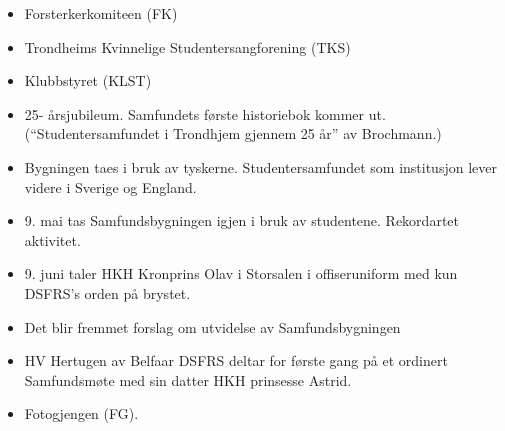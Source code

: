 
\begin{itemize}
  \item Forsterkerkomiteen (FK)
  \item Trondheims Kvinnelige Studentersangforening (TKS)
\end{itemize}


\begin{itemize}
  \item Klubbstyret (KLST)
\end{itemize}


\begin{itemize}
  \item 25- årsjubileum. Samfundets første historiebok kommer ut. (``Studentersamfundet i Trondhjem gjennem 25 år'' av
Brochmann.)
\end{itemize}


\begin{itemize}
  \item Bygningen taes i bruk av tyskerne. Studentersamfundet som institusjon lever videre i Sverige og England.
\end{itemize}


\begin{itemize}
  \item 9. mai tas Samfundsbygningen igjen i bruk av studentene. Rekordartet aktivitet.
  \item 9. juni taler HKH Kronprins Olav i Storsalen i offiseruniform med kun DSFRS's orden på brystet.
\end{itemize}


\begin{itemize}
  \item Det blir fremmet forslag om utvidelse av Samfundsbygningen
\end{itemize}


\begin{itemize}
  \item HV Hertugen av Belfaar DSFRS deltar for første gang på et ordinert Samfundsmøte med sin datter HKH
prinsesse Astrid.
\end{itemize}


\begin{itemize}
  \item Fotogjengen (FG).
\end{itemize}

